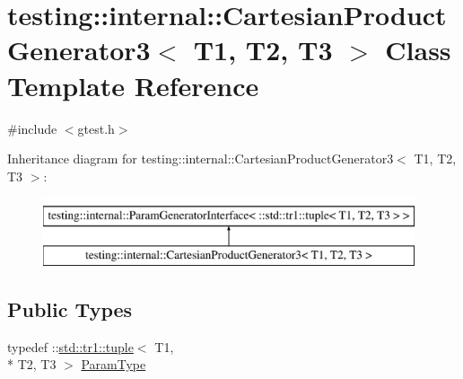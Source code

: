 \hypertarget{classtesting_1_1internal_1_1_cartesian_product_generator3}{\section{testing\-:\-:internal\-:\-:Cartesian\-Product\-Generator3$<$ T1, T2, T3 $>$ Class Template Reference}
\label{classtesting_1_1internal_1_1_cartesian_product_generator3}
}


{\ttfamily \#include $<$gtest.\-h$>$}

Inheritance diagram for testing\-:\-:internal\-:\-:Cartesian\-Product\-Generator3$<$ T1, T2, T3 $>$\-:\begin{figure}[H]
\begin{center}
\leavevmode
\includegraphics[height=2.000000cm]{classtesting_1_1internal_1_1_cartesian_product_generator3}
\end{center}
\end{figure}
\subsection*{Public Types}
\begin{DoxyCompactItemize}
\item 
typedef \-::\hyperlink{classstd_1_1tr1_1_1tuple}{std\-::tr1\-::tuple}$<$ T1, \\*
T2, T3 $>$ \hyperlink{classtesting_1_1internal_1_1_cartesian_product_generator3_a8819b73a6af2ecca7d25e09f759f2757}{Param\-Type}
\end{DoxyCompactItemize}
